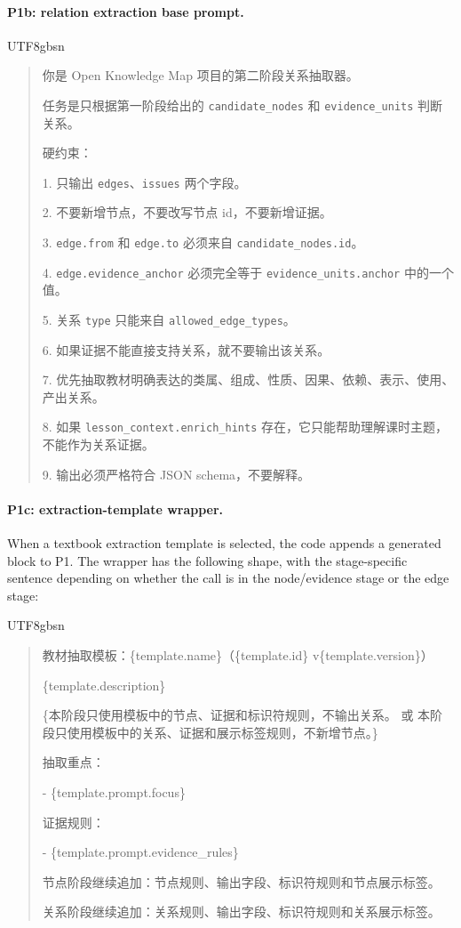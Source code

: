 \documentclass[11pt,letterpaper]{article}
\newcommand{\code}[1]{\nolinkurl{#1}}
\newenvironment{prompttranscript}{%
\begin{CJK}{UTF8}{gbsn}%
\begin{quote}%
\small%
\sloppy%
\setlength{\parskip}{0.35em}%
\setlength{\parindent}{0pt}%
}{%
\end{quote}%
\end{CJK}%
}
\newenvironment{prompttranscript}{%
\begin{quote}%
\small%
\sloppy%
\setlength{\parskip}{0.35em}%
\setlength{\parindent}{0pt}%
}{%
\end{quote}%
}
\begin{document}
\paragraph{P1b: relation extraction base prompt.}
\begin{prompttranscript}
你是 Open Knowledge Map 项目的第二阶段关系抽取器。\par
任务是只根据第一阶段给出的 \code{candidate\_nodes} 和 \code{evidence\_units} 判断关系。\par

硬约束：\par
1. 只输出 \code{edges}、\code{issues} 两个字段。\par
2. 不要新增节点，不要改写节点 id，不要新增证据。\par
3. \code{edge.from} 和 \code{edge.to} 必须来自 \code{candidate\_nodes.id}。\par
4. \code{edge.evidence\_anchor} 必须完全等于 \code{evidence\_units.anchor} 中的一个值。\par
5. 关系 \code{type} 只能来自 \code{allowed\_edge\_types}。\par
6. 如果证据不能直接支持关系，就不要输出该关系。\par
7. 优先抽取教材明确表达的类属、组成、性质、因果、依赖、表示、使用、产出关系。\par
8. 如果 \code{lesson\_context.enrich\_hints} 存在，它只能帮助理解课时主题，不能作为关系证据。\par
9. 输出必须严格符合 JSON schema，不要解释。
\end{prompttranscript}

\paragraph{P1c: extraction-template wrapper.}
When a textbook extraction template is selected, the code appends a generated block to P1. The wrapper has the following shape, with the stage-specific sentence depending on whether the call is in the node/evidence stage or the edge stage:

\begin{prompttranscript}
教材抽取模板：\{template.name\}（\{template.id\} v\{template.version\}）\par
\{template.description\}\par
\{本阶段只使用模板中的节点、证据和标识符规则，不输出关系。 或 本阶段只使用模板中的关系、证据和展示标签规则，不新增节点。\}\par

抽取重点：\par
- \{template.prompt.focus\}\par

证据规则：\par
- \{template.prompt.evidence\_rules\}\par

节点阶段继续追加：节点规则、输出字段、标识符规则和节点展示标签。\par
关系阶段继续追加：关系规则、输出字段、标识符规则和关系展示标签。
\end{prompttranscript}
\end{document}
